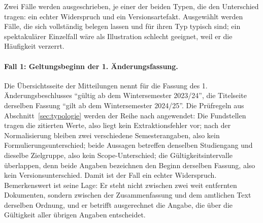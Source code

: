 Zwei Fälle werden ausgeschrieben, je einer der beiden Typen, die den Unterschied tragen: ein
echter Widerspruch und ein Versionsartefakt. Ausgewählt werden Fälle, die sich vollständig
belegen lassen und für ihren Typ typisch sind; ein spektakulärer Einzelfall wäre als
Illustration schlecht geeignet, weil er die Häufigkeit verzerrt.

\paragraph{Fall 1: Geltungsbeginn der 1. Änderungsfassung.}
Die Übersichtsseite der Mitteilungen nennt für die Fassung des 1. Änderungsbeschlusses
\enquote{gültig ab dem Wintersemester 2023/24}, die Titelseite derselben Fassung
\enquote{gilt ab dem Wintersemester 2024/25}. Die Prüfregeln aus
Abschnitt~\ref{sec:typologie} werden der Reihe nach angewendet: Die Fundstellen tragen die
zitierten Werte, also liegt kein Extraktionsfehler vor; nach der Normalisierung bleiben zwei
verschiedene Semesterangaben, also kein Formulierungsunterschied; beide Aussagen betreffen
denselben Studiengang und dieselbe Zielgruppe, also kein Scope-Unterschied; die
Gültigkeitsintervalle überlappen, denn beide Angaben bezeichnen den Beginn derselben Fassung,
also kein Versionsunterschied. Damit ist der Fall ein echter Widerspruch. Bemerkenswert ist
seine Lage: Er steht nicht zwischen zwei weit entfernten Dokumenten, sondern zwischen der
Zusammenfassung und dem amtlichen Text derselben Ordnung, und er betrifft ausgerechnet die
Angabe, die über die Gültigkeit aller übrigen Angaben entscheidet.

